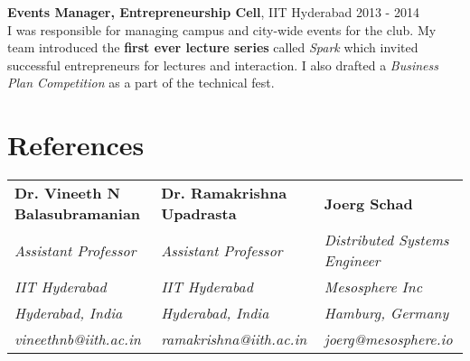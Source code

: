 \documentclass[margin,line]{res}
\begin{document}
\begin{resume}
  \vspace*{-2.5mm}

  {\bf Events Manager, Entrepreneurship Cell}, IIT Hyderabad \hfill 2013 - 2014 \\
    I was responsible for managing campus and city-wide events for the club. My team introduced the {\bf first ever lecture series} called {\it Spark} which invited successful entrepreneurs for lectures and interaction. I also drafted a {\it Business Plan Competition} as a part of the technical fest.

\section{\sc References}

  \begin{tabular}{@{}p{1.85in}p{2in}p{2in}}

  {\bf Dr. Vineeth N \newline Balasubramanian } & {\bf Dr. Ramakrishna \newline Upadrasta} & {\bf Joerg Schad} \\
        {\it Assistant Professor} & {\it Assistant Professor} & {\it Distributed Systems Engineer} \\
        {\it IIT Hyderabad} & {\it IIT Hyderabad} & {\it Mesosphere Inc} \\
        {\it Hyderabad, India} & {\it Hyderabad, India} & {\it Hamburg, Germany} \\
        {\it vineethnb@iith.ac.in} & {\it ramakrishna@iith.ac.in} & {\it joerg@mesosphere.io} \\

  \end{tabular}

\end{resume}
\end{document}
